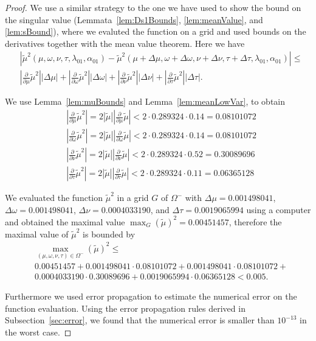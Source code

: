 \documentclass{article}
\newcommand\munn{{\tilde \mu}}
\renewcommand{\leq}{\leqslant}
\begin{document}
\begin{proof}
We use a similar strategy to the one we have used to show the bound on the singular value (Lemmata~\ref{lem:Ds1Bounds}, \ref{lem:meanValue}, and \ref{lem:sBound}), where
we evaluted the function on a grid and used bounds on the derivatives together with the mean value theorem.
Here we have
\begin{align}
&\left| {\munn}^2 (\mu, \omega, \nu,\tau,\lambda_{\mathrm 01}, \alpha_{\mathrm 01}) - 
{\munn}^2 (\mu +\Delta \mu, \omega+\Delta \omega, \nu + \Delta \nu,\tau + \Delta \tau,\lambda_{\mathrm 01}, \alpha_{\mathrm 01}) \right|
\leq \\ \nonumber
&\left| \frac{\partial}{\partial \mu}{\munn}^2 \right| |\Delta \mu| + 
\left| \frac{\partial}{\partial \omega}{\munn}^2 \right| |\Delta \omega|+
\left| \frac{\partial}{\partial \nu}{\munn}^2 \right| |\Delta \nu|+
\left| \frac{\partial}{\partial \tau}{\munn}^2 \right| |\Delta \tau|.
\end{align}

We use Lemma~\ref{lem:muBounds} and Lemma~\ref{lem:meanLowVar}, to obtain 
\begin{align}
& \left| \frac{\partial}{\partial \mu}{\munn}^2 \right| = 2  \left| \munn \right|  \left| \frac{\partial}{\partial \mu} \munn \right| <
2 \cdot 0.289324 \cdot 0.14 = 0.08101072 \\ \nonumber
& \left| \frac{\partial}{\partial \omega}{\munn}^2 \right| = 2  \left| \munn \right|  \left| \frac{\partial}{\partial \omega} \munn \right| <
2 \cdot 0.289324 \cdot 0.14 = 0.08101072 \\ \nonumber
& \left| \frac{\partial}{\partial \nu}{\munn}^2 \right| = 2  \left| \munn \right|  \left| \frac{\partial}{\partial \nu} \munn \right| <
2 \cdot 0.289324 \cdot 0.52 = 0.30089696 \\ \nonumber
& \left| \frac{\partial}{\partial \tau}{\munn}^2 \right| = 2  \left| \munn \right|  \left| \frac{\partial}{\partial \tau} \munn \right| <
2 \cdot 0.289324 \cdot 0.11 =  0.06365128 
\end{align}

We evaluated the function ${\munn}^2$ in a grid $G$ of $\Omega^-$ with $\Delta \mu =0.001498041 $,
$\Delta \omega = 0.001498041$,
$\Delta \nu = 0.0004033190$, and
$\Delta \tau = 0.0019065994$ using a computer and obtained the maximal value $\max _{G} (\munn)^2=0.00451457$, therefore 
the maximal value of   ${\munn}^2$ is bounded by
\begin{align}
&\max _ {(\mu, \omega, \nu, \tau) \in \Omega^-} (\munn)^2 \leq \\ \nonumber
&0.00451457 +  0.001498041 \cdot  0.08101072 + 0.001498041 \cdot  0.08101072 + \\
& 0.0004033190 \cdot 0.30089696 + 0.0019065994 \cdot 0.06365128 < 0.005.
\end{align}


Furthermore we used error propagation to estimate the numerical error on the function evaluation. Using the error propagation rules 
derived in Subsection~\ref{sec:error}, we found that the numerical error is smaller than $10^{-13}$ in the worst case.
\end{proof}
\end{document}
